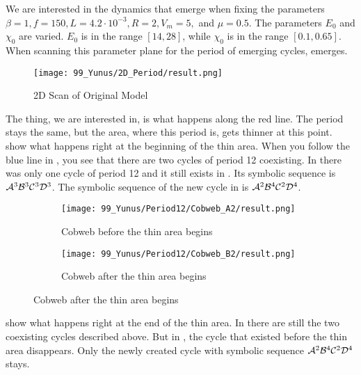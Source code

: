 We are interested in the dynamics that emerge when fixing the parameters $\beta = 1, f = 150, L = 4.2 \cdot 10^{-3}, R = 2, V_m = 5,$ and $\mu = 0.5$.
The parameters $E_0$ and $\chi_0$ are varied.
$E_0$ is in the range $[14, 28]$, while $\chi_0$ is in the range $[0.1, 0.65]$.
When scanning this parameter plane for the period of emerging cycles,  emerges.

\begin{figure}
    \centering
    \texttt{[image: 99\_Yunus/2D\_Period/result.png]}
    \caption{2D Scan of Original Model}
    \label{fig:yunus.2pi.2d.full}
\end{figure}

The thing, we are interested in, is what happens along the red line.
The period stays the same, but the area, where this period is, gets thinner at this point.
 show what happens right at the beginning of the thin area.
When you follow the blue line in , you see that there are two cycles of period 12 coexisting.
In  there was only one cycle of period 12 and it still exists in .
Its symbolic sequence is $\mathcal{A}^3\mathcal{B}^3\mathcal{C}^3\mathcal{D}^3$.
The symbolic sequence of the new cycle in  is $\mathcal{A}^2\mathcal{B}^4\mathcal{C}^2\mathcal{D}^4$.

\begin{figure}
    \centering
    \begin{subfigure}{0.4\textwidth}
        \centering
        \texttt{[image: 99\_Yunus/Period12/Cobweb\_A2/result.png]}
        \caption{Cobweb before the thin area begins}
        \label{fig:yunus.2pi.CobwebA2}
    \end{subfigure}
    \begin{subfigure}{0.4\textwidth}
        \centering
        \texttt{[image: 99\_Yunus/Period12/Cobweb\_B2/result.png]}
        \caption{Cobweb after the thin area begins}
        \label{fig:yunus.2pi.CobwebB2}
    \end{subfigure}
\end{figure}

 show what happens right at the end of the thin area.
In  there are still the two coexisting cycles described above.
But in , the cycle that existed before the thin area disappears.
Only the newly created cycle with symbolic sequence $\mathcal{A}^2\mathcal{B}^4\mathcal{C}^2\mathcal{D}^4$ stays.


